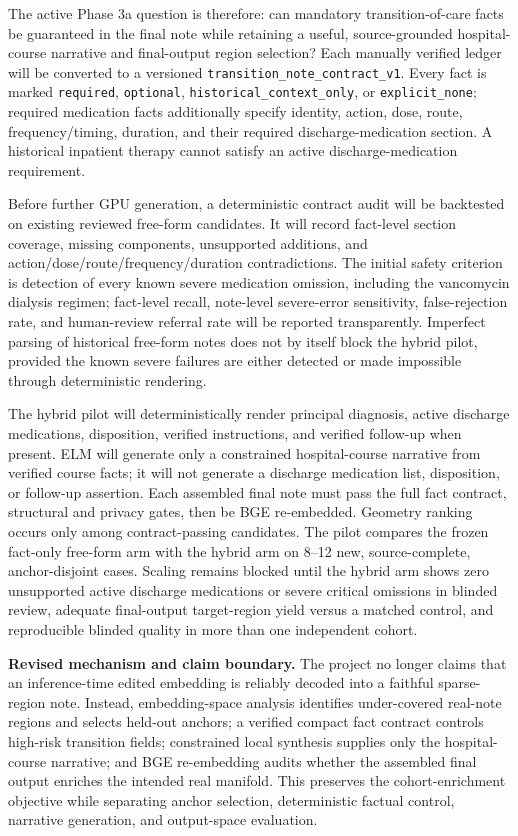 \documentclass[11pt]{article}
\begin{document}
The active Phase 3a question is therefore: can mandatory transition-of-care facts be guaranteed in the final note while retaining a useful, source-grounded hospital-course narrative and final-output region selection? Each manually verified ledger will be converted to a versioned \texttt{transition\_note\_contract\_v1}. Every fact is marked \texttt{required}, \texttt{optional}, \texttt{historical\_context\_only}, or \texttt{explicit\_none}; required medication facts additionally specify identity, action, dose, route, frequency/timing, duration, and their required discharge-medication section. A historical inpatient therapy cannot satisfy an active discharge-medication requirement.

Before further GPU generation, a deterministic contract audit will be backtested on existing reviewed free-form candidates. It will record fact-level section coverage, missing components, unsupported additions, and action/dose/route/frequency/duration contradictions. The initial safety criterion is detection of every known severe medication omission, including the vancomycin dialysis regimen; fact-level recall, note-level severe-error sensitivity, false-rejection rate, and human-review referral rate will be reported transparently. Imperfect parsing of historical free-form notes does not by itself block the hybrid pilot, provided the known severe failures are either detected or made impossible through deterministic rendering.

The hybrid pilot will deterministically render principal diagnosis, active discharge medications, disposition, verified instructions, and verified follow-up when present. ELM will generate only a constrained hospital-course narrative from verified course facts; it will not generate a discharge medication list, disposition, or follow-up assertion. Each assembled final note must pass the full fact contract, structural and privacy gates, then be BGE re-embedded. Geometry ranking occurs only among contract-passing candidates. The pilot compares the frozen fact-only free-form arm with the hybrid arm on 8--12 new, source-complete, anchor-disjoint cases. Scaling remains blocked until the hybrid arm shows zero unsupported active discharge medications or severe critical omissions in blinded review, adequate final-output target-region yield versus a matched control, and reproducible blinded quality in more than one independent cohort.

\noindent\textbf{Revised mechanism and claim boundary.}
The project no longer claims that an inference-time edited embedding is reliably decoded into a faithful sparse-region note. Instead, embedding-space analysis identifies under-covered real-note regions and selects held-out anchors; a verified compact fact contract controls high-risk transition fields; constrained local synthesis supplies only the hospital-course narrative; and BGE re-embedding audits whether the assembled final output enriches the intended real manifold. This preserves the cohort-enrichment objective while separating anchor selection, deterministic factual control, narrative generation, and output-space evaluation.
\end{document}
